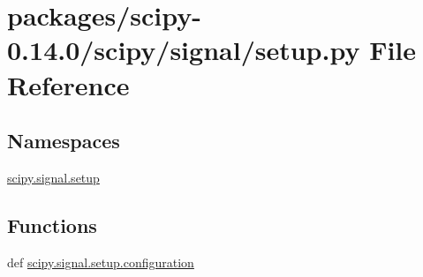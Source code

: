 \hypertarget{packages_2scipy-0_814_80_2scipy_2signal_2setup_8py}{}\section{packages/scipy-\/0.14.0/scipy/signal/setup.py File Reference}
\label{packages_2scipy-0_814_80_2scipy_2signal_2setup_8py}
\subsection*{Namespaces}
\begin{DoxyCompactItemize}
\item 
 \hyperlink{namespacescipy_1_1signal_1_1setup}{scipy.\+signal.\+setup}
\end{DoxyCompactItemize}
\subsection*{Functions}
\begin{DoxyCompactItemize}
\item 
def \hyperlink{namespacescipy_1_1signal_1_1setup_a09dd81ec2a790d8fbaebc80e3aadb5f7}{scipy.\+signal.\+setup.\+configuration}
\end{DoxyCompactItemize}
